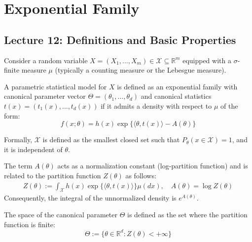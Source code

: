 \chapter{Exponential Family}

\section{Lecture 12: Definitions and Basic Properties}
Consider a random variable $X = (X_{1}, \dots, X_{m}) \in \mathcal{X} \subseteq \mathbb{R}^{m}$ equipped with a $\sigma$-finite measure $\mu$ (typically a counting measure or the Lebesgue measure).

\begin{de}
    A parametric statistical model for $X$ is defined as an exponential family with canonical parameter vector $\Theta = (\theta_1, \dots, \theta_d)$ and canonical statistics $t(x) = (t_1(x), \dots, t_d(x))$ if it admits a density with respect to $\mu$ of the form:
\begin{equation*}
    f(x; \theta) = h(x) \exp\{\langle \theta, t(x) \rangle - A(\theta)\} \label{eq:exp_fam}
\end{equation*}
\end{de}
\begin{remark}
    Formally, $\mathcal{X}$ is defined as the smallest closed set such that $P_{\theta}(x \in \mathcal{X}) = 1$, and it is independent of $\theta$.
\end{remark}

\begin{de}
    The term $A(\theta)$ acts as a normalization constant (log-partition function) and is related to the partition function $Z(\theta)$ as follows:
\begin{align*}
    Z(\theta) := \int_{\mathcal{X}} h(x) \exp\{\langle \theta, t(x) \rangle\} \mu(dx),\quad 
    A(\theta) = \log Z(\theta)
\end{align*}
Consequently, the integral of the unnormalized density is $e^{A(\theta)}$.

The space of the canonical parameter $\Theta$ is defined as the set where the partition function is finite:
\begin{equation*}
    \Theta := \{ \theta \in \mathbb{R}^{d} : Z(\theta) < +\infty \}
\end{equation*}
\end{de}


